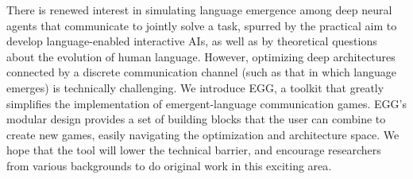 There is renewed interest in simulating language emergence among deep neural agents that communicate to jointly solve a task, spurred by the practical aim to develop language-enabled interactive AIs, as well as by theoretical questions about the evolution of human language. However, optimizing deep architectures connected by a discrete communication channel (such as that in which language emerges) is technically challenging. We introduce EGG, a toolkit that greatly simplifies the implementation of emergent-language communication games. EGG's modular design provides a set of building blocks that the user can combine to create new games, easily navigating the optimization and architecture space. We hope that the tool will lower the technical barrier, and encourage researchers from various backgrounds to do original work in this exciting area.